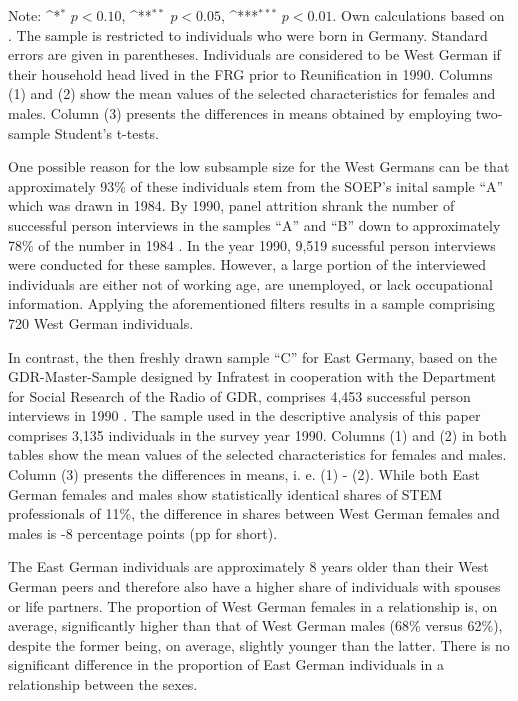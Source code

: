 \documentclass[a4paper, oneside, hyperfootnotes = false]{article}
\def\sym#1{\ifmmode^{#1}\else\(^{#1}\)\fi}
\begin{document}
{\begin{table}[ht]
\begin{center}
		\parbox{10cm}{
			\linespread{1}\footnotesize Note: \sym{*} \(p<0.10\), \sym{**} \(p<0.05\), \sym{***} \(p<0.01\). Own calculations based on \cite{SOEP2023}. The sample is restricted to individuals who were born in Germany. Standard errors are given in parentheses. Individuals are considered to be West German if their household head lived in the FRG prior to Reunification in 1990. Columns (1) and (2) show the mean values of the selected characteristics for females and males. Column (3) presents the differences in means obtained by employing two-sample Student's t-tests.}
		
	\end{center}
\end{table}

One possible reason for the low subsample size for the West Germans can be that approximately 93\% of these individuals stem from the SOEP's inital sample ``A'' which was drawn in 1984.
By 1990, panel attrition shrank the number of successful person interviews in the samples ``A'' and ``B'' down to approximately 78\% of the number in 1984 \citep{Siegers2022}.
In the year 1990, 9,519 sucessful person interviews were conducted for these samples.
However, a large portion of the interviewed individuals are either not of working age, are unemployed, or lack occupational information.
Applying the aforementioned filters results in a sample comprising 720 West German individuals.

In contrast, the then freshly drawn sample ``C'' for East Germany, based on the GDR-Master-Sample designed by Infratest in cooperation with the Department for Social Research of the Radio of GDR, comprises 4,453 successful person interviews in 1990 \citep{Infratest2011, Siegers2022}.
The sample used in the descriptive analysis of this paper comprises 3,135 individuals in the survey year 1990.
Columns (1) and (2) in both tables show the mean values of the selected characteristics for females and males.
Column (3) presents the differences in means, i. e. (1) - (2).
While both East German females and males show statistically identical shares of STEM professionals of 11\%, the difference in shares between West German females and males is -8 percentage points (pp for short).

The East German individuals are approximately 8 years older than their West German peers and therefore also have a higher share of individuals with spouses or life partners.
The proportion of West German females in a relationship is, on average, significantly higher than that of West German males (68\% versus 62\%), despite the former being, on average, slightly younger than the latter.
There is no significant difference in the proportion of East German individuals in a relationship between the sexes.

}
\end{document}
